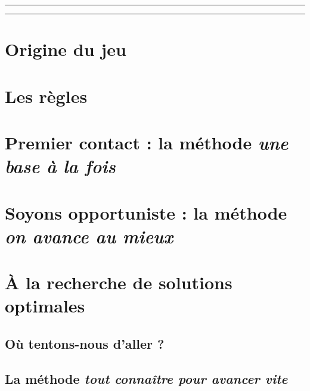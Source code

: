 \documentclass[a4,11pt]{article}
\begin{document}

\vspace{3cm}

\hrule

\tableofcontents

\vspace{4ex}

\hrule

\newpage



\section{Origine du jeu}    %
    


\section{Les règles}    %
    


\section{Premier contact : la méthode \textit{\og une base à la fois \fg}}    %
    


\section{Soyons opportuniste : la méthode \textit{\og on avance au mieux \fg}}    %
    


\section{À la recherche de solutions optimales}
    \subsection{Où tentons-nous d'aller ?}    %
        

    \subsection{La méthode \textit{\og tout connaître pour avancer vite \fg}}
\end{document}
